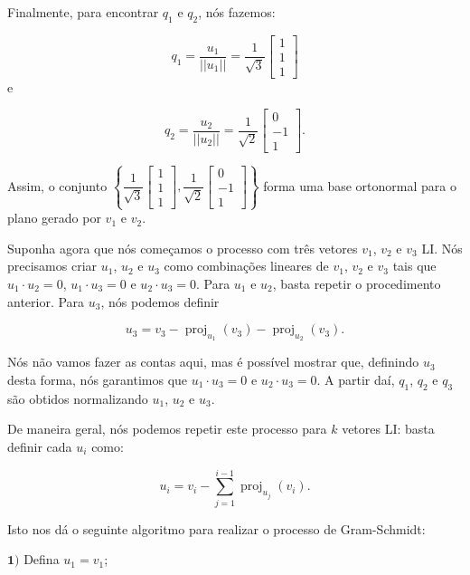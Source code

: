 \begin{Example}
	Finalmente, para encontrar $q_1$ e $q_2$, nós fazemos:
	
	$$
	q_1 = \dfrac{u_1}{||u_1||} = \dfrac{1}{\sqrt{3}}\begin{bmatrix}
		1 \\
		1 \\
		1
	\end{bmatrix}
	$$
	e 
	
	$$
	q_2 = \dfrac{u_2}{||u_2||} = \dfrac{1}{\sqrt{2}}\begin{bmatrix}
		0 \\
		-1 \\
		1
	\end{bmatrix}.
	$$
	
	Assim, o conjunto $\left\{\dfrac{1}{\sqrt{3}}\begin{bmatrix}
		1 \\
		1 \\
		1
	\end{bmatrix}, \dfrac{1}{\sqrt{2}}\begin{bmatrix}
		0 \\
		-1 \\
		1
	\end{bmatrix}\right\}$ forma uma base ortonormal para o plano gerado por $v_1$ e $v_2$.
\end{Example}

Suponha agora que nós começamos o processo com três vetores $v_1$, $v_2$ e $v_3$ LI. Nós precisamos criar $u_1$, $u_2$ e $u_3$ como combinações lineares de $v_1$, $v_2$ e $v_3$ tais que $u_1\cdot u_2 = 0$, $u_1\cdot u_3 = 0$ e $u_2\cdot u_3 = 0$. Para $u_1$ e $u_2$, basta repetir o procedimento anterior. Para $u_3$, nós podemos definir

$$
u_3 = v_3 - \operatorname{proj}_{u_1}(v_3) - \operatorname{proj}_{u_2}(v_3).
$$

Nós não vamos fazer as contas aqui, mas é possível mostrar que, definindo $u_3$ desta forma, nós garantimos que $u_1\cdot u_3 = 0$ e $u_2\cdot u_3 = 0$. A partir daí, $q_1$, $q_2$ e $q_3$ são obtidos normalizando $u_1$, $u_2$ e $u_3$.

De maneira geral, nós podemos repetir este processo para $k$ vetores LI: basta definir cada $u_i$ como:

$$
u_i = v_i - \sum\limits_{j = 1}^{i - 1}\operatorname{proj}_{u_j}(v_i).
$$

Isto nos dá o seguinte algoritmo para realizar o processo de Gram-Schmidt:

$\mathbf{1)}$ Defina $u_1 = v_1$;

